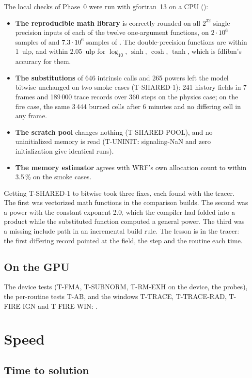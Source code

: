 The local checks of Phase~0 were run with gfortran~13 on a CPU ():
\begin{itemize}
  \item \textbf{The reproducible math library} is correctly rounded on all $2^{32}$ single-precision inputs of each of
    the twelve one-argument functions, on $2\cdot10^6$ samples of  and $7.3\cdot10^6$ samples of
    . The double-precision functions are within 1~ulp, and within 2.05~ulp for $\log_{10}$, $\sinh$,
    $\cosh$, $\tanh$, which is fdlibm's accuracy for them.
  \item \textbf{The substitutions} of 646 intrinsic calls and 265 powers left the model bitwise unchanged on two
    smoke cases (T-SHARED-1): 241 history fields in 7 frames and 189\,000 trace records over 360 steps on the physics
    case; on the fire case, the same 3\,444 burned cells after 6 minutes and no differing cell in any frame.
  \item \textbf{The scratch pool} changes nothing (T-SHARED-POOL), and no uninitialized memory is read (T-UNINIT:
    signaling-NaN and zero initialization give identical runs).
  \item \textbf{The memory estimator} agrees with WRF's own allocation count to within 3.5\,\% on the smoke cases.
\end{itemize}
Getting T-SHARED-1 to bitwise took three fixes, each found with the tracer. The first was vectorized math functions
in the comparison builds. The second was a power with the constant exponent 2.0, which the compiler had folded into a
product while the substituted function computed a general power. The third was a missing include path in an
incremental build rule. The lesson is in the tracer: the first differing record pointed at the field, the step and the
routine each time.

\subsection{On the GPU}

The device tests (T-FMA, T-SUBNORM, T-RM-EXH on the device, the probes), the per-routine tests T-AB, and the windows
T-TRACE, T-TRACE-RAD, T-FIRE-IGN and T-FIRE-WIN: \tbr.

\section{Speed}

\subsection{Time to solution}

